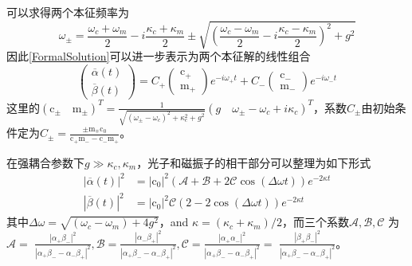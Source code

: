 可以求得两个本征频率为
\begin{equation}
\omega_{\pm}=\frac{\omega_{c}+\omega_{m}}{2}-i \frac{\kappa_{c}+\kappa_{m}}{2} \pm \sqrt{\left(\frac{\omega_{c}-\omega_{m}}{2}-i \frac{\kappa_{c}-\kappa_{m}}{2}\right)^{2}+g^{2}}
\end{equation}
因此\eqref{FormalSolution}可以进一步表示为两个本征解的线性组合
\begin{equation}
\left(\begin{array}{c}
\overline{\alpha}(t) \\
\overline{\beta}(t)
\end{array}\right)=C_{+}\left(\begin{array}{c}
\mathrm{c}_{+} \\
\mathrm{m}_{+}
\end{array}\right) e^{-i \omega_{+} t}+C_{-}\left(\begin{array}{c}
\mathrm{c}_{-} \\
\mathrm{m}_{-}
\end{array}\right) e^{-i \omega_{-} t}
\end{equation}
这里的$\left(\mathrm{c}_{\pm} \quad \mathrm{m}_{\pm}\right)^T=\frac{1}{\sqrt{\left(\omega_{\pm}-\omega_{c}\right)^{2}+\kappa_{c}^{2}+g^{2}}}\left(g \quad \omega_{\pm}-\omega_{c}+i \kappa_{c}\right)^T$，系数$C_{\pm}$由初始条件定为$C_{\pm}=\frac{\pm \mathrm{m}_{\mp}\mathrm{c}_{0}}{\mathrm{c}_{+} \mathrm{m}_{-}-\mathrm{c}_{-} \mathrm{m}_{+}}$。

在强耦合参数下$g\gg\kappa_c,\kappa_m$，光子和磁振子的相干部分可以整理为如下形式
\begin{equation}
\begin{aligned}
|\overline{\alpha}(t)|^{2} &=\left|\mathrm{c}_{0}\right|^{2}(\mathcal{A}+\mathcal{B}+2 \mathcal{C} \cos (\Delta \omega t)) e^{-2 \kappa t} \\
|\overline{\beta}(t)|^{2} &=\left|\mathrm{c}_{0}\right|^{2} \mathcal{C}(2-2 \cos (\Delta \omega t)) e^{-2 \kappa t}
\end{aligned}\label{RabiOssilation}
\end{equation}
其中$\Delta \omega=\sqrt{\left(\omega_{c}-\omega_{m}\right)+4 g^{2}}$，and $\kappa=(\kappa_{c}+\kappa_{m})/2$，而三个系数$\mathcal{A}, \mathcal{B}, \mathcal{C}$ 为 $\mathcal{A}=$ $\frac{\left|\alpha_{+} \beta_{-}\right|^{2}}{\left|\alpha_{+} \beta_{-}-\alpha_{-} \beta_{+}\right|^{2}}, \mathcal{B}=\frac{\left|\alpha_{-} \beta_{+}\right|^{2}}{\left|\alpha_{+} \beta_{-}-\alpha_{-} \beta_{+}\right|^{2}}, \mathcal{C}=\frac{\left|\alpha_{+} \alpha_{-}\right|^{2}}{\left|\alpha_{+} \beta_{-}-\alpha_{-} \beta_{+}\right|^{2}}=$ $\frac{\left|\beta_{+} \beta_{-}\right|^{2}}{\left|\alpha_{+} \beta_{-}-\alpha_{-} \beta_{+}\right|^{2}}$。

